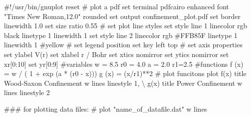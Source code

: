 \documentclass[
  letterpaper,
]{article}
\newenvironment{Shaded}{\begin{snugshade}}{\end{snugshade}}
\newcommand{\BuiltInTok}[1]{\textcolor[rgb]{0.00,0.23,0.31}{#1}}
\newcommand{\CommentTok}[1]{\textcolor[rgb]{0.37,0.37,0.37}{#1}}
\newcommand{\DecValTok}[1]{\textcolor[rgb]{0.68,0.00,0.00}{#1}}
\newcommand{\FloatTok}[1]{\textcolor[rgb]{0.68,0.00,0.00}{#1}}
\newcommand{\NormalTok}[1]{\textcolor[rgb]{0.00,0.23,0.31}{#1}}
\newcommand{\OperatorTok}[1]{\textcolor[rgb]{0.37,0.37,0.37}{#1}}
\newcommand{\StringTok}[1]{\textcolor[rgb]{0.13,0.47,0.30}{#1}}
\begin{document}
\begin{Shaded}
\begin{Highlighting}[]
    \CommentTok{\#!/usr/bin/gnuplot}
\NormalTok{    reset}
    \CommentTok{\# plot a pdf}
    \BuiltInTok{set}\NormalTok{ terminal pdfcairo enhanced font }\StringTok{"Times New Roman,12.0"}\NormalTok{ rounded}
    \BuiltInTok{set}\NormalTok{ output }\StringTok{\textquotesingle{}confinement\_plot.pdf\textquotesingle{}}
    \BuiltInTok{set}\NormalTok{ border linewidth }\FloatTok{1.0}
    \BuiltInTok{set}\NormalTok{ size ratio }\FloatTok{0.55}
    \CommentTok{\# set plot line styles}
    \BuiltInTok{set}\NormalTok{ style line }\DecValTok{1}\NormalTok{ linecolor rgb }\StringTok{\textquotesingle{}black\textquotesingle{}}\NormalTok{   linetype }\DecValTok{1}\NormalTok{ linewidth }\DecValTok{1}
    \BuiltInTok{set}\NormalTok{ style line }\DecValTok{2}\NormalTok{ linecolor rgb }\StringTok{\textquotesingle{}\#FFB85F\textquotesingle{}}\NormalTok{ linetype }\DecValTok{1}\NormalTok{ linewidth }\DecValTok{1}   \CommentTok{\#yellow}
    \CommentTok{\# set legend position}
    \BuiltInTok{set}\NormalTok{ key left top}
    \CommentTok{\# set axis properties}
    \BuiltInTok{set}\NormalTok{ ylabel }\StringTok{\textquotesingle{}V(r)\textquotesingle{}}
    \BuiltInTok{set}\NormalTok{ xlabel }\StringTok{\textquotesingle{}r / Bohr\textquotesingle{}}
    \BuiltInTok{set}\NormalTok{ xtics nomirror}
    \BuiltInTok{set}\NormalTok{ ytics nomirror}
    \BuiltInTok{set}\NormalTok{ xr[}\DecValTok{0}\NormalTok{:}\DecValTok{10}\NormalTok{]}
    \BuiltInTok{set}\NormalTok{ yr[}\DecValTok{0}\NormalTok{:}\DecValTok{9}\NormalTok{]}
    \CommentTok{\#variables}
\NormalTok{    w }\OperatorTok{=} \FloatTok{8.5}
\NormalTok{    r0 }\OperatorTok{=} \FloatTok{4.0}
\NormalTok{    a }\OperatorTok{=} \FloatTok{2.0}
\NormalTok{    r1}\OperatorTok{=}\FloatTok{2.5}
    \CommentTok{\#functions}
\NormalTok{    f (x) }\OperatorTok{=}\NormalTok{ w }\OperatorTok{/}\NormalTok{ ( }\DecValTok{1} \OperatorTok{+}\NormalTok{ exp (a }\OperatorTok{*}\NormalTok{ (r0 }\OperatorTok{{-}}\NormalTok{ x)))}
\NormalTok{    g (x) }\OperatorTok{=}\NormalTok{ (x}\OperatorTok{/}\NormalTok{r1)}\OperatorTok{**}\DecValTok{2}
    \CommentTok{\# plot funcitons}
\NormalTok{    plot  f(x)  title }\StringTok{\textquotesingle{}Wood{-}Saxon Confinement\textquotesingle{}}\NormalTok{ w lines linestyle }\DecValTok{1}\NormalTok{, }\OperatorTok{\textbackslash{}}
\NormalTok{              g(x)  title }\StringTok{\textquotesingle{}Power Confinement\textquotesingle{}}\NormalTok{      w lines linestyle }\DecValTok{2}

    \CommentTok{\#\#\# for plotting data files:}
    \CommentTok{\# plot "name\_of\_datafile.dat" w lines }
\end{Highlighting}
\end{Shaded}
\end{document}
